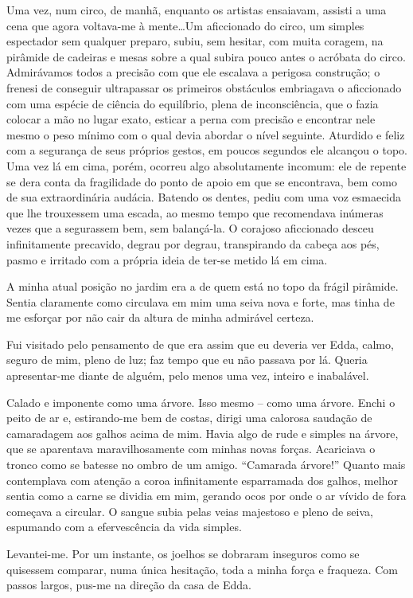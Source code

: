Uma vez, num circo, de manhã, enquanto os artistas ensaiavam, assisti a uma cena que agora voltava-me à mente\dots Um aficcionado do circo, um simples espectador sem qualquer preparo, subiu, sem hesitar, com muita coragem, na pirâmide de cadeiras e mesas sobre a qual subira pouco antes o acróbata do circo. Admirávamos todos a precisão com que ele escalava a perigosa construção; o frenesi de conseguir ultrapassar os primeiros obstáculos embriagava o aficcionado com uma espécie de ciência do equilíbrio, plena de inconsciência, que o fazia colocar a mão no lugar exato, esticar a perna com precisão e encontrar nele mesmo o peso mínimo com o qual devia abordar o nível seguinte. Aturdido e feliz com a segurança de seus próprios gestos, em poucos segundos ele alcançou o topo. Uma vez lá em cima, porém, ocorreu algo absolutamente incomum: ele de repente se dera conta da fragilidade do ponto de apoio em que se encontrava, bem como de sua extraordinária audácia. Batendo os dentes, pediu com uma voz esmaecida que lhe trouxessem uma escada, ao mesmo tempo que recomendava inúmeras vezes que a segurassem bem, sem balançá-la. O corajoso aficcionado desceu infinitamente precavido, degrau por degrau, transpirando da cabeça aos pés, pasmo e irritado com a própria ideia de ter-se metido lá em cima.

A minha atual posição no jardim era a de quem está no topo da frágil pirâmide. Sentia claramente como circulava em mim uma seiva nova e forte, mas tinha de me esforçar por não cair da altura de minha admirável certeza.

Fui visitado pelo pensamento de que era assim que eu deveria ver Edda, calmo, seguro de mim, pleno de luz; faz tempo que eu não passava por lá. Queria apresentar-me diante de alguém, pelo menos uma vez, inteiro e inabalável.

Calado e imponente como uma árvore. Isso mesmo -- como uma árvore. Enchi o peito de ar e, estirando-me bem de costas, dirigi uma calorosa saudação de camaradagem aos galhos acima de mim. Havia algo de rude e simples na árvore, que se aparentava maravilhosamente com minhas novas forças. Acariciava o tronco como se batesse no ombro de um amigo. ``Camarada árvore!'' Quanto mais contemplava com atenção a coroa infinitamente esparramada dos galhos, melhor sentia como a carne se dividia em mim, gerando ocos por onde o ar vívido de fora começava a circular. O sangue subia pelas veias majestoso e pleno de seiva, espumando com a efervescência da vida simples.

Levantei-me. Por um instante, os joelhos se dobraram inseguros como se quisessem comparar, numa única hesitação, toda a minha força e fraqueza. Com passos largos, pus-me na direção da casa de Edda.

